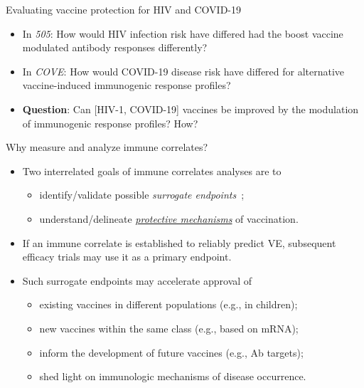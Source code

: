 \documentclass{beamer}
\begin{document}
\begin{frame}[c]{Evaluating vaccine protection for HIV and COVID-19}

\begin{center}
\begin{itemize}
  \itemsep8pt
  \item In \textit{505}: How would HIV infection risk have differed had
    the boost vaccine modulated antibody responses differently?
  \item In \textit{COVE}: How would COVID-19 disease risk have differed for
    alternative vaccine-induced immunogenic response profiles?
  \item \textbf{Question}: Can [HIV-1, COVID-19] vaccines be improved by the
    modulation of immunogenic response profiles? How?
\end{itemize}
\end{center}

\note{
}

\end{frame}


\begin{frame}[c]{Why measure and analyze immune correlates?}

\begin{center}
\begin{itemize}
  \itemsep8pt
  \item Two interrelated goals of immune correlates analyses are to
    \begin{itemize}
      \itemsep0pt
      \item identify/validate possible \textit{surrogate
        endpoints}~\citep{prentice1989surrogate};
      \item understand/delineate \underline{\textit{protective mechanisms}} of
        vaccination.
    \end{itemize}
  \item If an immune correlate is established to reliably predict VE,
    subsequent efficacy trials may use it as a primary endpoint.
  \item Such surrogate endpoints may accelerate approval of
    \begin{itemize}
      \itemsep0pt
      \item existing vaccines in different populations (e.g., in children);
      \item new vaccines within the same class (e.g., based on mRNA);
      \item inform the development of future vaccines (e.g., Ab targets);
      \item shed light on immunologic mechanisms of disease occurrence.
    \end{itemize}
\end{itemize}
\end{center}

\note{
}

\end{frame}
\end{document}
